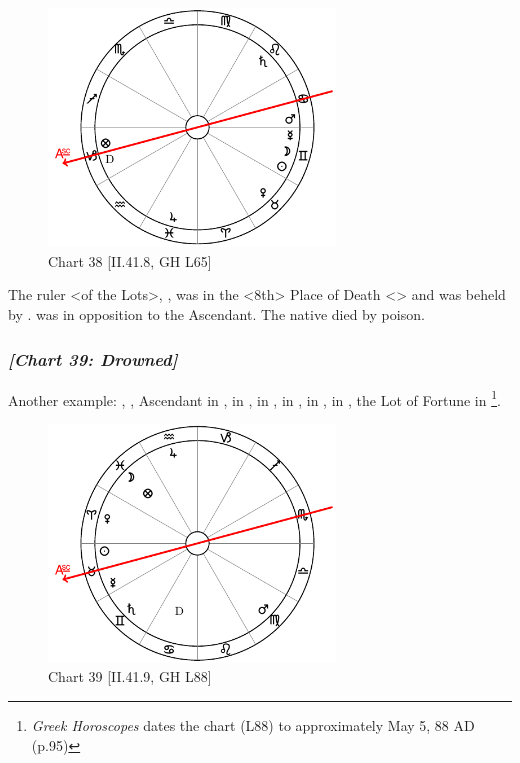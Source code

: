 \clearpage
\begin{figure}
\centering
\vspace{-20pt}
\includegraphics[width=0.68\textwidth]{charts/2_41_8}
\caption{Chart 38 [II.41.8, GH L65]}
\label{fig:chart38}
\end{figure} 
 
The ruler <of the Lots>, \Saturn, was in the <8th> Place of Death <\Leo> and was beheld by \Venus. \Mars\xspace was in opposition to the Ascendant. The native died by poison.
\newpage
\subsubsection{\textit{[Chart 39: Drowned]}}
Another example: \Sun, \Mercury, Ascendant in \Taurus, \Moon\xspace in \Pisces, \Saturn\xspace in \Gemini, \Jupiter\xspace in \Aquarius, \Mars\xspace in \Virgo, \Venus\xspace in \Aries, the Lot of Fortune in \Pisces
\footnote{\textit{Greek Horoscopes} dates the chart (L88) to approximately May 5, 88 AD (p.95)}.   

\clearpage
\begin{figure}
\centering
\vspace{-20pt}
\includegraphics[width=0.68\textwidth]{charts/2_41_9}
\caption{Chart 39 [II.41.9, GH L88]}
\label{fig:chart39}
\end{figure} 

